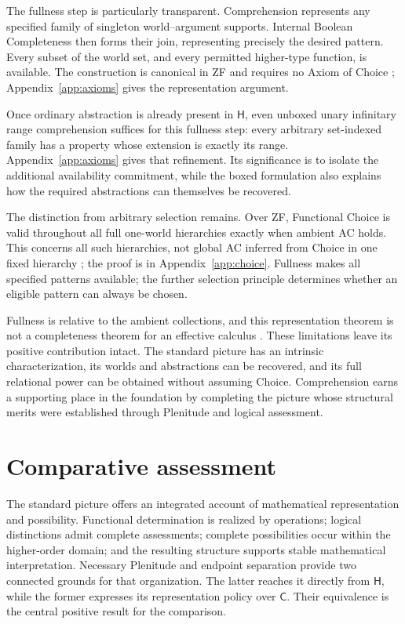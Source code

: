 \documentclass[12pt,letterpaper]{article}
\newcommand{\Hlogic}{\mathsf H}
\newcommand{\C}{\mathsf C}
\begin{document}
The fullness step is particularly transparent. Comprehension represents any specified family of singleton world--argument supports. Internal Boolean Completeness then forms their join, representing precisely the desired pattern. Every subset of the world set, and every permitted higher-type function, is available. The construction is canonical in ZF and requires no Axiom of Choice \citep[\S\S3, 5]{intrinsic}; Appendix~\ref{app:axioms} gives the representation argument.

Once ordinary abstraction is already present in $\Hlogic$, even unboxed unary infinitary range comprehension suffices for this fullness step: every arbitrary set-indexed family has a property whose extension is exactly its range. Appendix~\ref{app:axioms} gives that refinement. Its significance is to isolate the additional availability commitment, while the boxed formulation also explains how the required abstractions can themselves be recovered.

The distinction from arbitrary selection remains. Over ZF, Functional Choice is valid throughout all full one-world hierarchies exactly when ambient AC holds. This concerns all such hierarchies, not global AC inferred from Choice in one fixed hierarchy \citep[\S6]{intrinsic}; the proof is in Appendix~\ref{app:choice}. Fullness makes all specified patterns available; the further selection principle determines whether an eligible pattern can always be chosen.

Fullness is relative to the ambient collections, and this representation theorem is not a completeness theorem for an effective calculus \citep[\S\S3--5]{calculus}. These limitations leave its positive contribution intact. The standard picture has an intrinsic characterization, its worlds and abstractions can be recovered, and its full relational power can be obtained without assuming Choice. Comprehension earns a supporting place in the foundation by completing the picture whose structural merits were established through Plenitude and logical assessment.

\section{Comparative assessment}\label{sec:verdict}

The standard picture offers an integrated account of mathematical representation and possibility. Functional determination is realized by operations; logical distinctions admit complete assessments; complete possibilities occur within the higher-order domain; and the resulting structure supports stable mathematical interpretation. Necessary Plenitude and endpoint separation provide two connected grounds for that organization. The latter reaches it directly from $\Hlogic$, while the former expresses its representation policy over $\C$. Their equivalence is the central positive result for the comparison.
\end{document}
